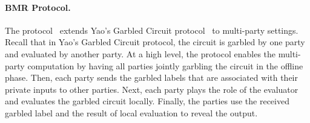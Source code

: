 \paragraph{BMR Protocol.}
\label{para:BMRProtocol}
The \bmr protocol~\cite{beaver1990round} extends Yao's Garbled Circuit protocol~\cite{yao1986generate} to multi-party settings. Recall that in Yao's Garbled Circuit protocol, the circuit is garbled by one party and evaluated by another party. At a high level, the \bmr protocol enables the multi-party computation by having all parties jointly garbling the circuit in the offline phase. Then, each party sends the garbled labels that are associated with their private inputs to other parties. Next, each party plays the role of the evaluator and evaluates the garbled circuit locally. Finally, the parties use the received garbled label and the result of local evaluation to reveal the output.








